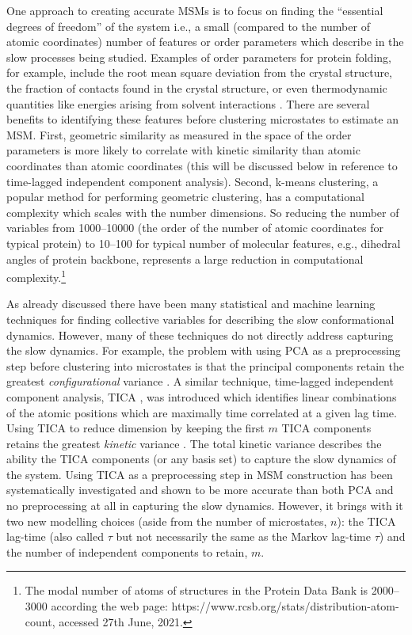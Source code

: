 One approach to creating accurate MSMs is to focus on finding the ``essential degrees of freedom'' of the system \cite{zwanzigClassicalDynamicsContinuous1983a, schutteDirectApproachConformational1999} i.e., a small (compared to the number of atomic coordinates) number of features or order parameters which describe in the slow processes being studied. Examples of order parameters for protein folding, for example, include the root mean square deviation from the crystal structure, the fraction of contacts found in the crystal structure, or even thermodynamic quantities like energies arising from solvent interactions \cite{chongExaminingThermodynamicOrder2018}. There are several benefits to identifying these features before clustering microstates to estimate an MSM. First, geometric similarity as measured in the space of the order parameters is more likely to correlate with kinetic similarity than atomic coordinates than atomic coordinates (this will be discussed below in reference to time-lagged independent component analysis).  Second, k-means clustering, a popular method for performing geometric clustering, has a computational complexity which scales with the number dimensions. So reducing the number of variables from \numrange{1000}{10000} (the order of the number of atomic coordinates for typical protein) to \numrange{10}{100} for typical number of molecular features, e.g., dihedral angles of protein backbone, represents a large reduction in computational complexity.\footnote{The modal number of atoms of structures in the Protein Data Bank is \numrange{2000}{3000} according the web page: https://www.rcsb.org/stats/distribution-atom-count, accessed 27th June, 2021.}


As already discussed there have been many statistical and machine learning techniques for finding collective variables for describing the slow conformational dynamics. However, many of these techniques do not directly address capturing the slow dynamics. For example, the problem with using PCA as a preprocessing step before clustering into microstates is that the principal components retain the greatest \emph{configurational} variance \cite{perez-hernandezIdentificationSlowMolecular2013a}. A similar technique, time-lagged independent component analysis, TICA \cite{perez-hernandezIdentificationSlowMolecular2013a, schwantesImprovementsMarkovState2013}, was introduced which identifies linear combinations of the atomic positions which are maximally time correlated at a given lag time. Using TICA to reduce dimension by keeping the first $m$ TICA components retains the greatest \emph{kinetic} variance \cite{noeKineticDistanceKinetic2015}. The total kinetic variance describes the ability  the TICA components (or any basis set) to capture the slow dynamics of the system. Using TICA as a preprocessing step in MSM construction has been systematically investigated and shown to be more accurate than both PCA and no preprocessing at all \cite{husicOptimizedParameterSelection2016} in capturing the slow dynamics. However, it brings with it two new modelling choices (aside from the number of microstates, $n$): the TICA lag-time (also called $\tau$ but not necessarily the same as the Markov lag-time $\tau$) and the number of independent components to retain, $m$.  


